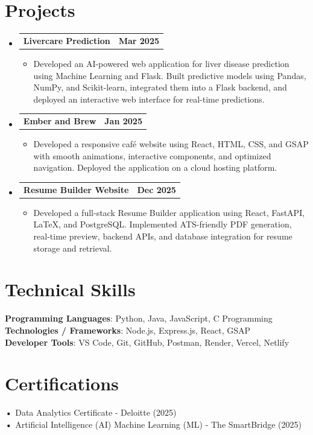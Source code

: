 \documentclass[letterpaper,11pt]{article}
\makeatletter
\newcommand{\resumeItem}[1]{
  \item\small{#1}
}
\newcommand{\resumeSubHeadingListStart}{\begin{itemize}[label={}]}
\newcommand{\resumeSubHeadingListEnd}{\end{itemize}}
\newcommand{\resumeItemListStart}{\begin{itemize}}
\newcommand{\resumeItemListEnd}{\end{itemize}}
\newcommand{\resumeProjectHeading}[2]{
  \item
  \begin{tabular*}{\textwidth}{l@{\extracolsep{\fill}}r}
    #1 & \textbf{#2} \\
  \end{tabular*}
}
\makeatother
\begin{document}
\section{Projects}
\resumeSubHeadingListStart
\resumeProjectHeading{\textbf{Livercare Prediction}}{Mar 2025}
\resumeItemListStart
\resumeItem{Developed an AI-powered web application for liver disease prediction using Machine Learning and Flask. Built predictive models using Pandas, NumPy, and Scikit-learn, integrated them into a Flask backend, and deployed an interactive web interface for real-time predictions.}
\resumeItemListEnd
\resumeProjectHeading{\textbf{Ember and Brew}}{Jan 2025}
\resumeItemListStart
\resumeItem{Developed a responsive café website using React, HTML, CSS, and GSAP with smooth animations, interactive components, and optimized navigation. Deployed the application on a cloud hosting platform.}
\resumeItemListEnd
\resumeProjectHeading{\textbf{Resume Builder Website}}{Dec 2025}
\resumeItemListStart
\resumeItem{Developed a full-stack Resume Builder application using React, FastAPI, LaTeX, and PostgreSQL. Implemented ATS-friendly PDF generation, real-time preview, backend APIs, and database integration for resume storage and retrieval.}
\resumeItemListEnd

\resumeSubHeadingListEnd

\section{Technical Skills}
\resumeSubHeadingListStart
\small{\item{
\textbf{Programming Languages}: Python, Java, JavaScript, C Programming \\
\textbf{Technologies / Frameworks}: Node.js, Express.js, React, GSAP \\
\textbf{Developer Tools}: VS Code, Git, GitHub, Postman, Render, Vercel, Netlify \\
}}

\resumeSubHeadingListEnd

\section{Certifications}
\resumeSubHeadingListStart
\small{\item{
\textbf{•} Data Analytics Certificate - Deloitte (2025) \\
\textbf{•} Artificial Intelligence (AI) Machine Learning (ML) - The SmartBridge (2025) \\
}}

\resumeSubHeadingListEnd
\end{document}
